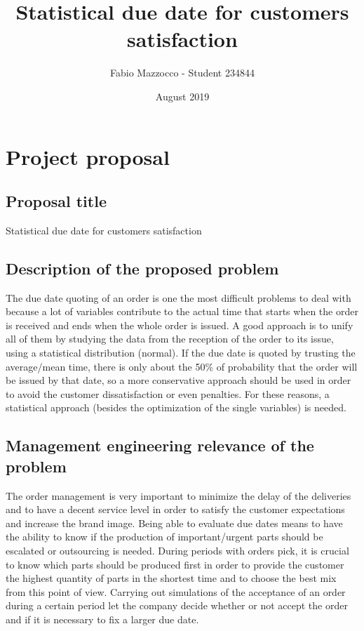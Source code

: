 \documentclass[a4paper,12pt]{article}
\begin{document}


\title{Statistical due date for customers satisfaction }
\author{Fabio Mazzocco - Student  234844}
\date{August 2019}
\maketitle

\section{Project proposal} 
\subsection{Proposal title}
Statistical due date for customers satisfaction

\subsection{Description of the proposed problem}

The due date quoting of an order is one the most difficult problems to deal with because a lot of variables contribute to the actual time that starts when the order is received and ends when the whole order is issued. A good approach is to unify all of them by studying the data from the reception of the order to its issue, using a statistical distribution (normal). If the due date is quoted by trusting the average/mean time, there is only about the 50\% of probability that the order will be issued by that date, so a more conservative approach should be used in order to avoid the customer dissatisfaction or even penalties. For these reasons, a statistical approach (besides the optimization of the single variables) is needed.

\subsection{Management engineering relevance of the problem}

The order management is very important to minimize the delay of the deliveries and to have a decent service level in order to satisfy the customer expectations and increase the brand image. Being able to evaluate due dates means to have the ability to know if the production of important/urgent parts should be escalated or outsourcing is needed. During periods with orders pick, it is crucial to know which parts should be produced first in order to provide the customer the highest quantity of parts in the shortest time and to choose the best mix from this point of view. Carrying out simulations of the acceptance of an order during a certain period let the company decide whether or not accept the order and if it is necessary to fix a larger due date.
\end{document}
